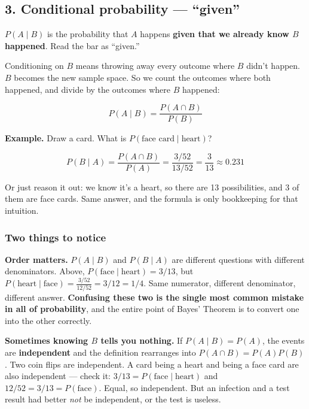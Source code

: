 \documentclass[
]{article}
\begin{document}
\subsection{\texorpdfstring{3. Conditional probability ---
``\textbf{given}''}{3. Conditional probability --- ``given''}}\label{conditional-probability-given}

\(P(A \mid B)\) is the probability that \(A\) happens \textbf{given that
we already know \(B\) happened}. Read the bar as ``given.''

Conditioning on \(B\) means throwing away every outcome where \(B\)
didn't happen. \(B\) becomes the new sample space. So we count the
outcomes where both happened, and divide by the outcomes where \(B\)
happened:

\[P(A \mid B) = \frac{P(A \cap B)}{P(B)}\]

\textbf{Example.} Draw a card. What is
\(P(\text{face card} \mid \text{heart})\)?

\[P(B \mid A) = \frac{P(A \cap B)}{P(A)} = \frac{3/52}{13/52} = \frac{3}{13} \approx 0.231\]

Or just reason it out: we know it's a heart, so there are 13
possibilities, and 3 of them are face cards. Same answer, and the
formula is only bookkeeping for that intuition.

\subsubsection{Two things to notice}\label{two-things-to-notice}

\textbf{Order matters.} \(P(A \mid B)\) and \(P(B \mid A)\) are
different questions with different denominators. Above,
\(P(\text{face} \mid \text{heart}) = 3/13\), but
\(P(\text{heart} \mid \text{face}) = \frac{3/52}{12/52} = 3/12 = 1/4\).
Same numerator, different denominator, different answer.
\textbf{Confusing these two is the single most common mistake in all of
probability}, and the entire point of Bayes' Theorem is to convert one
into the other correctly.

\textbf{Sometimes knowing \(B\) tells you nothing.} If
\(P(A \mid B) = P(A)\), the events are \textbf{independent} and the
definition rearranges into \(P(A \cap B) = P(A)P(B)\). Two coin flips
are independent. A card being a heart and being a face card are also
independent --- check it: \(3/13 = P(\text{face} \mid \text{heart})\)
and \(12/52 = 3/13 = P(\text{face})\). Equal, so independent. But an
infection and a test result had better \emph{not} be independent, or the
test is useless.
\end{document}
